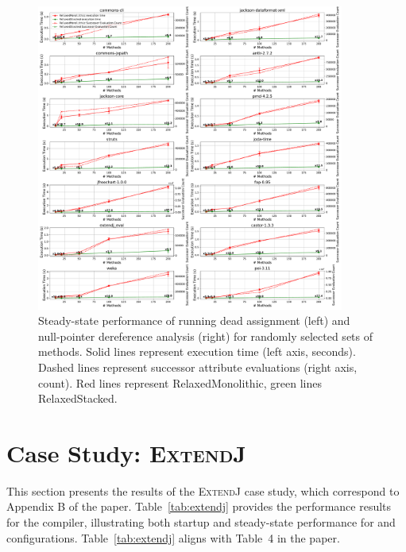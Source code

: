 \documentclass[acmsmall, screen, review, nonacm]{acmart}
\begin{document}
\begin{figure}[H]
  \centering
  \includegraphics[width=0.9\textwidth]{intraj_ondemand_npa_relaxedmonolithic_vs_intraj_ondemand_npa_relaxedstackedon-demand.pdf}
  \caption{
    Steady-state performance of running dead assignment (left) and null-pointer dereference analysis (right) for randomly selected sets of methods. Solid lines represent execution time (left axis, seconds). Dashed lines represent successor attribute evaluations (right axis, count). Red lines represent RelaxedMonolithic, green lines RelaxedStacked.
  }
\end{figure}

\appendix
\section{Case Study: \textsc{ExtendJ}}
This section presents the results of the \textsc{ExtendJ} case study, which
correspond to Appendix B of the paper. Table~\ref{tab:extendj} provides the
performance results for the \ExtendJ{} compiler, illustrating both startup and
steady-state performance for \relaxedMonolithic{} and \relaxedstacked{}
configurations. Table~\ref{tab:extendj} aligns with Table~4 in the
paper.



\end{document}
